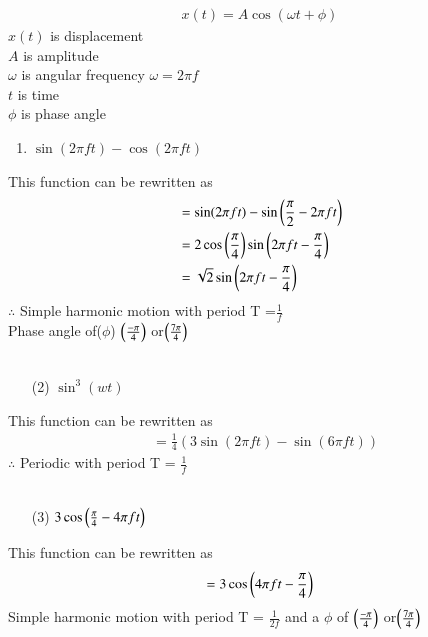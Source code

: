 \documentclass[journal,12pt,twocolumn]{IEEEtran}
\theoremstyle{remark}
\begin{document}
   \begin{align}
       x(t)=A\cos(\omega t +\phi)
   \end{align}
   $x(t)$ is displacement\\
   $A$ is amplitude\\
   $\omega $ is angular frequency $\omega=2\pi f$\\
   $t$ is time\\
   $\phi$ is phase angle
   \\
   \begin{enumerate}
 \item $\sin(2\pi f t)- \cos(2\pi f t)$\\
  \end{enumerate}
  This function can be rewritten as\\ 
 \begin{align}
  &= \sin(2\pi f t) - \sin\left(\frac{\pi}{2} - 2\pi f t\right)\\
  &=2 \cos\left(\frac{\pi}{4}\right) \sin\left(2\pi f t - \frac{\pi}{4}\right)\\
  &=\sqrt{2}\sin\left(2\pi f t - \frac{\pi}{4}\right)
 \end{align}
 $\therefore$ Simple harmonic motion with period {T} =$\frac{1}{f}$\\ Phase angle of($\phi$) $\left(\frac{-\pi}{4}\right)$ or$\left(\frac{7\pi}{4}\right)$\\
\\
\begin{enumerate}
    \item[(2)] $\sin^3(wt)$\\
\end{enumerate}
 This function can be rewritten as\\ 
 \begin{align}
  &=\frac{1}{4}(3\sin(2\pi f t)-\sin(6\pi  f t))
 \end{align}
 $\therefore$ Periodic with period {T} = $\frac{1}{f}$ \\
\\
\begin{enumerate}
    \item[(3)] $3\cos\left(\frac{\pi}{4}-4\pi f t\right)$\\
\end{enumerate}
This function can be rewritten as\\ 
 \begin{align}
  =3\cos\left(4\pi f t-\frac{\pi}{4}\right)\\
 \end{align}
 Simple harmonic motion with period {T} = $\frac{1}{2f}$  and a $\phi$ of  $\left(\frac{-\pi}{4}\right)$ or$\left(\frac{7\pi}{4}\right)$\\
\end{document}

